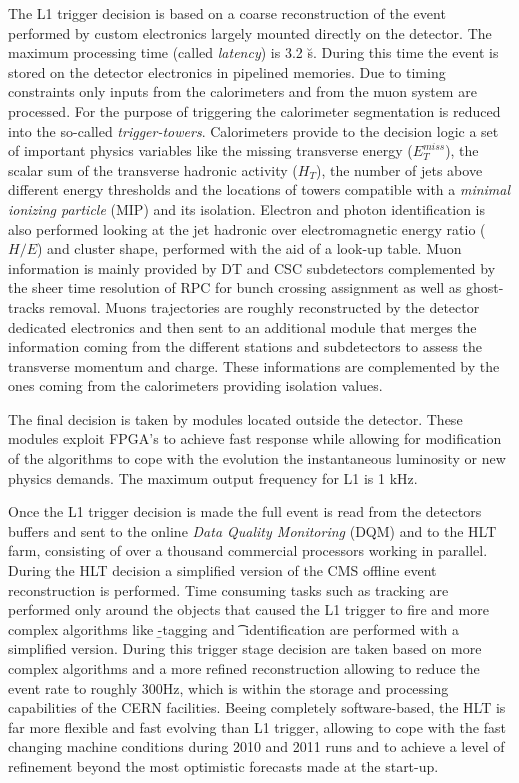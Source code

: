 The L1 trigger decision is based on a coarse reconstruction of the event performed by custom electronics largely mounted directly on the detector. The maximum processing time (called \emph{latency}) is 3.2 \u s. During this time the event is stored on the detector electronics in pipelined memories. Due to timing constraints only inputs from the calorimeters and from the muon system are processed. For the purpose of triggering the calorimeter segmentation is reduced into the so-called \emph{trigger-towers}. Calorimeters provide to the decision logic a set of important physics variables like the missing transverse energy ($E_T^{miss}$), the scalar sum of the transverse hadronic activity ($H_T$), the number of jets above different energy thresholds and the locations of towers compatible with a \emph{minimal ionizing particle} (MIP) and its isolation. Electron and photon identification is also performed looking at the jet hadronic over electromagnetic energy ratio ($H/E$) and cluster shape, performed with the aid of a look-up table. Muon information is mainly provided by DT and CSC subdetectors complemented by the sheer time resolution of RPC for bunch crossing assignment as well as ghost-tracks removal. Muons trajectories are roughly reconstructed by the detector dedicated electronics and then sent to an additional module that merges the information coming from the different stations and subdetectors to assess the transverse momentum  and charge. These informations are complemented by the ones coming from the calorimeters providing isolation values.

The final decision is taken by modules located outside the detector. These modules exploit FPGA's to achieve fast response while allowing for modification of the algorithms to cope with the evolution the instantaneous luminosity or new physics demands. The maximum output frequency for L1 is 1 kHz.

Once the L1 trigger decision is made the full event is read from the detectors buffers and sent to the online \emph{Data Quality Monitoring} (DQM) and to the HLT farm, consisting of over a thousand commercial processors working in parallel. During the HLT decision a simplified version of the CMS offline event reconstruction is performed. Time consuming tasks such as tracking are performed only around the objects that caused the L1 trigger to fire and more complex algorithms like \b-tagging and \t~identification are performed with a simplified version. During this trigger stage decision are taken based on more complex algorithms and a more refined reconstruction allowing to reduce the event rate to roughly 300Hz, which is within the storage and processing capabilities of the CERN facilities. Beeing completely software-based, the HLT is far more flexible and fast evolving than L1 trigger, allowing to cope with the fast changing machine conditions during 2010 and 2011 runs and to achieve a level of refinement beyond the most optimistic forecasts made at the start-up.

